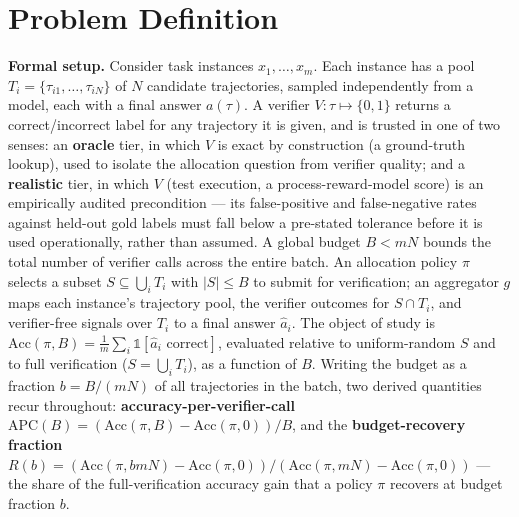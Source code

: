 \documentclass[11pt]{article}
\begin{document}
\section{Problem Definition}

\noindent\textbf{Formal setup.} Consider task instances $x_1, \dots, x_m$. Each instance has a pool $T_i = \{\tau_{i1}, \dots, \tau_{iN}\}$ of $N$ candidate trajectories, sampled independently from a model, each with a final answer $a(\tau)$. A verifier $V: \tau \mapsto \{0, 1\}$ returns a correct/incorrect label for any trajectory it is given, and is trusted in one of two senses: an \textbf{oracle} tier, in which $V$ is exact by construction (a ground-truth lookup), used to isolate the allocation question from verifier quality; and a \textbf{realistic} tier, in which $V$ (test execution, a process-reward-model score) is an empirically audited precondition --- its false-positive and false-negative rates against held-out gold labels must fall below a pre-stated tolerance before it is used operationally, rather than assumed. A global budget $B < mN$ bounds the total number of verifier calls across the entire batch. An allocation policy $\pi$ selects a subset $S \subseteq \bigcup_i T_i$ with $|S| \le B$ to submit for verification; an aggregator $g$ maps each instance's trajectory pool, the verifier outcomes for $S \cap T_i$, and verifier-free signals over $T_i$ to a final answer $\hat a_i$. The object of study is $\text{Acc}(\pi, B) = \frac{1}{m}\sum_i \mathbb{1}[\hat a_i \text{ correct}]$, evaluated relative to uniform-random $S$ and to full verification ($S = \bigcup_i T_i$), as a function of $B$. Writing the budget as a fraction $b = B / (mN)$ of all trajectories in the batch, two derived quantities recur throughout: \textbf{accuracy-per-verifier-call} $\text{APC}(B) = (\text{Acc}(\pi, B) - \text{Acc}(\pi, 0)) / B$, and the \textbf{budget-recovery fraction} $R(b) = (\text{Acc}(\pi, bmN) - \text{Acc}(\pi, 0)) / (\text{Acc}(\pi, mN) - \text{Acc}(\pi, 0))$ --- the share of the full-verification accuracy gain that a policy $\pi$ recovers at budget fraction $b$.
\end{document}
